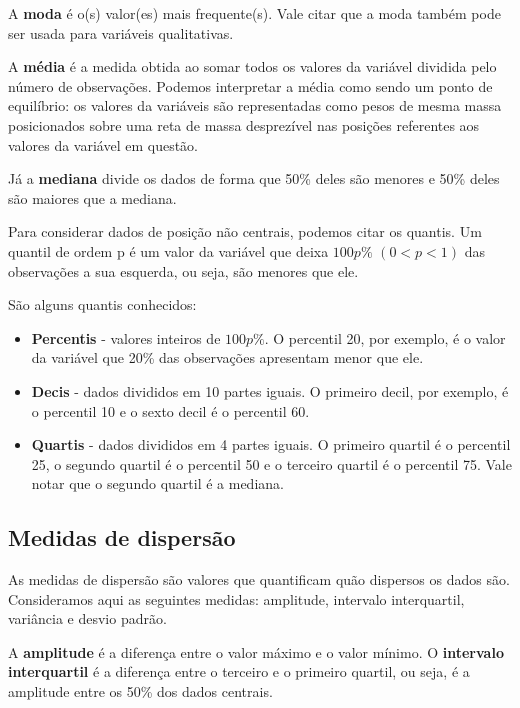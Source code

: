 \documentclass[
]{book}
\begin{document}
A \textbf{moda} é o(s) valor(es) mais frequente(s). Vale citar que a moda também pode ser usada para variáveis qualitativas.

A \textbf{média} é a medida obtida ao somar todos os valores da variável dividida pelo número de observações. Podemos interpretar a média como sendo um ponto de equilíbrio: os valores da variáveis são representadas como pesos de mesma massa posicionados sobre uma reta de massa desprezível nas posições referentes aos valores da variável em questão.

Já a \textbf{mediana} divide os dados de forma que 50\% deles são menores e 50\% deles são maiores que a mediana.

Para considerar dados de posição não centrais, podemos citar os quantis. Um quantil de ordem p é um valor da variável que deixa \(100p\%\) \((0 < p < 1)\) das observações a sua esquerda, ou seja, são menores que ele.

São alguns quantis conhecidos:

\begin{itemize}
\item
  \textbf{Percentis} - valores inteiros de \(100p\%\). O percentil 20, por exemplo, é o valor da variável que 20\% das observações apresentam menor que ele.
\item
  \textbf{Decis} - dados divididos em 10 partes iguais. O primeiro decil, por exemplo, é o percentil 10 e o sexto decil é o percentil 60.
\item
  \textbf{Quartis} - dados divididos em 4 partes iguais. O primeiro quartil é o percentil 25, o segundo quartil é o percentil 50 e o terceiro quartil é o percentil 75.
  Vale notar que o segundo quartil é a mediana.
\end{itemize}

\hypertarget{medidas-de-dispersuxe3o}{%
\subsection{Medidas de dispersão}\label{medidas-de-dispersuxe3o}}

As medidas de dispersão são valores que quantificam quão dispersos os dados são. Consideramos aqui as seguintes medidas: amplitude, intervalo interquartil, variância e desvio padrão.

A \textbf{amplitude} é a diferença entre o valor máximo e o valor mínimo. O \textbf{intervalo interquartil} é a diferença entre o terceiro e o primeiro quartil, ou seja, é a amplitude entre os 50\% dos dados centrais.
\end{document}
